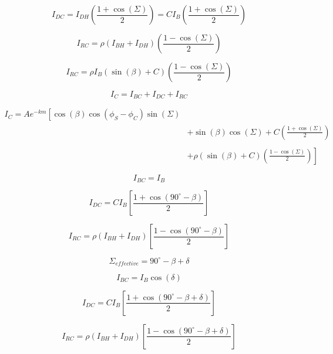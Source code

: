 \documentclass[12pt]{article}
\begin{document}
\begin{equation}
\label{diffc1}
I_{DC}=I_{DH}\left(\frac{1+\cos{(\Sigma)}}{2}\right)=CI_{B}\left(\frac{1+\cos{(\Sigma)}}{2}\right)
\end{equation}

\begin{equation}
\label{ref1}
I_{RC}=\rho(I_{BH}+I_{DH})\left(\frac{1-\cos{(\Sigma)}}{2}\right)
\end{equation}

\begin{equation}
\label{ref2}
I_{RC}=\rho I_{B}(\sin{(\beta)}+C)\left(\frac{1-\cos{(\Sigma)}}{2}\right)
\end{equation}

\begin{equation}
\label{totc1}
I_{C}=I_{BC}+I_{DC}+I_{RC}
\end{equation}

\begin{equation}
\label{totc2}
    \begin{aligned}
        I_{C}
        =Ae^{-km} \left[ \cos{(\beta)}\cos{(\phi_{S}-\phi_{C})}\sin{(\Sigma)} \\
       & + \sin{(\beta)}\cos{(\Sigma)} + C\left(\frac{1+\cos{(\Sigma)}}{2}\right) \\ \\
      & +\rho(\sin{(\beta)}+C)\left.\left(\frac{1-\cos{(\Sigma)}}{2}\right)\right]
   \end{aligned}
\end{equation}

\begin{equation}
\label{tda1}
I_{BC}=I_{B}
\end{equation}

\begin{equation}
\label{tda2}
I_{DC}=CI_{B} \left[ \frac{1+\cos{(90^{\circ}-\beta)}}{2} \right]
\end{equation}

\begin{equation}
\label{tda3}
I_{RC}=\rho(I_{BH}+I_{DH})\left[\frac{1-\cos{(90^{\circ}-\beta)}}{2}\right]
\end{equation}

\begin{equation}
\label{sat1}
\Sigma_{effective}=90^{\circ}-\beta +\delta
\end{equation}

\begin{equation}
\label{sat2}
I_{BC}=I_{B}\cos{(\delta)}
\end{equation}

\begin{equation}
\label{sat3}
I_{DC}=CI_{B} \left[ \frac{1+\cos{(90^{\circ}-\beta+\delta)}}{2} \right]
\end{equation}


\begin{equation}
\label{sat4}
I_{RC}=\rho(I_{BH}+I_{DH})\left[\frac{1-\cos{(90^{\circ}-\beta+\delta)}}{2}\right]
\end{equation}
\end{document}
